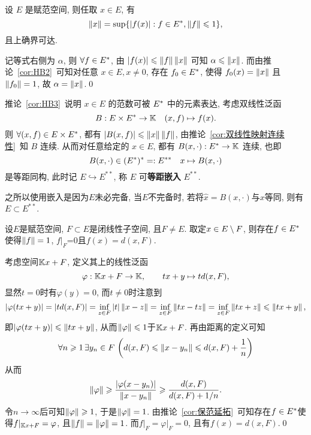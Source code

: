 	\begin{Corollary}\label{cor:HB3}
		设 $ E $ 是赋范空间, 则任取 $ x\in E $, 有
		\[
			\left\| x \right\|=\sup\{ \left| f(x) \right| :f\in E^{*}, \left\| f \right\|\leqslant1 \},
		\]
		且上确界可达.
	\end{Corollary}
	\begin{Proof}
		记等式右侧为 $ \alpha $, 则 $ \forall f\in E^{*} $, 由 $ \left| f(x) \right| \leqslant\left\| f \right\|\left\| x \right\| $ 可知 $ \alpha \leqslant\left\| x \right\| $. 而由推论~\ref{cor:HB2}~可知对任意 $ x\in E, x\ne 0 $, 存在 $ f_{0}\in E^{*} $, 使得 $ f_{0}(x)=\left\| x \right\| $ 且 $ \left\| f_{0} \right\|=1 $, 故 $ \alpha =\left\| x \right\| $.\qed
	\end{Proof}
	推论~\ref{cor:HB3}~说明 $ x\in E $ 的范数可被 $ E^{*} $ 中的元素表达, 考虑双线性泛函
	\[
		B:E\times E^{*}\to\mathbb{K}\quad(x, f)\mapsto f(x).
	\]
	则 $ \forall(x, f)\in E\times E^{*} $, 都有 $ \left| B(x, f) \right| \leqslant\left\| x \right\|\left\| f \right\| $, 由推论~\ref{cor:双线性映射连续性}~知 $ B $ 连续. 从而对任意给定的 $ x\in E $, 都有 $ B(x, \cdot):E^{*}\to\mathbb{K} $ 连续, 也即
	\[
		B(x,\cdot)\in(E^{*})^{*}=: E^{**}\quad x\mapsto B(x, \cdot)
	\]
	是等距同构, 此时记 $ E\hookrightarrow E^{**} $, 称 $ E $ 可\textbf{等距嵌入} $ E^{**} $.
	
	之所以使用嵌入是因为$ E $未必完备, 当$ E $不完备时, 若将$ \hat{x}=B(x,\cdot) $与$ x $等同, 则有$ E\subset E^{**} $.
	
	\begin{Corollary}\label{cor:HB4}
	设$ E $是赋范空间, $ F\subset E $是闭线性子空间, 且$ F\ne E $. 取定$ x\in E\setminus F $, 则存在$ f\in E^{*} $使得$ \left\| f \right\|=1 $, $ f\rvert_F $=0且$ f(x)=d(x,F) $.
	\end{Corollary}
	\begin{Proof}
	考虑空间$ \mathbb{K} x+F $, 定义其上的线性泛函
	\[
	\varphi : \mathbb{K} x+F\to\mathbb{K},\qquad tx+y\mapsto td(x,F),
	\]
	显然$ t=0 $时有$ \varphi(y)=0 $, 而$ t\ne 0 $时注意到
	\[
	\left| \varphi(tx+y) \right| =\left| td(x,F) \right| =\inf_{z\in F}\left| t \right| \left\| x-z \right\|=\inf_{z\in F}\left\| tx-tz \right\|=\inf_{z\in F}\left\| tx+z \right\|\leqslant\left\| tx+y \right\|,
	\]
	即$ \left| \varphi(tx+y) \right| \leqslant\left\| tx+y \right\| $, 从而$ \left\| \varphi \right\|\leqslant 1 $于$ \mathbb{K} x+F $. 再由距离的定义可知
	\[
	\forall n\geqslant 1\,\exists y_n\in F\,\left(d(x,F)\leqslant\left\| x-y_n \right\|\leqslant d(x,F)+\frac{1}{n}\right)
	\]
	从而
	\[
	\left\| \varphi \right\|\geqslant\frac{\left| \varphi(x-y_n) \right| }{\left\| x-y_n \right\|}\geqslant\frac{d(x,F)}{d(x,F)+1/n}.
	\]
	令$ n\to\infty $后可知$ \left\| \varphi \right\|\geqslant 1 $, 于是$ \left\| \varphi \right\|=1 $. 由推论~\ref{cor:保范延拓}~可知存在$ f\in E^{*} $使得$ f\rvert_{\mathbb{K} x+F}=\varphi $, 且$ \left\| f \right\|=\left\| \varphi \right\|=1 $. 而$ f\rvert_F=\varphi\rvert_F=0 $, 且有$ f(x)=d(x,F) $.\qed
	\end{Proof}
	
